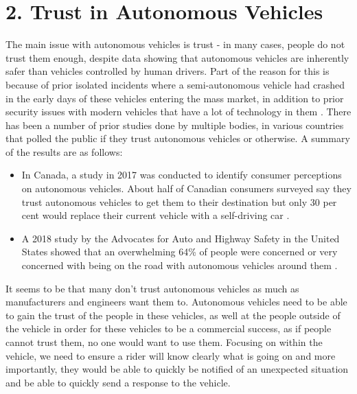 \documentclass{sigchi}
\begin{document}
\section{2. Trust in Autonomous Vehicles}

The main issue with autonomous vehicles is trust - in many cases, people do not trust them enough, despite data showing that autonomous vehicles are inherently safer than vehicles controlled by human drivers. Part of the reason for this is because of prior isolated incidents where a semi-autonomous vehicle had crashed in the early days of these vehicles entering the mass market, in addition to prior security issues with modern vehicles that have a lot of technology in them \cite{leggett_2018}. There has been a number of prior studies done by multiple bodies, in various countries that polled the public if they trust autonomous vehicles or otherwise. A summary of the results are as follows:
\begin{itemize}
\item In Canada, a study in 2017 was conducted to identify consumer perceptions on autonomous vehicles. About half of Canadian consumers surveyed say they trust autonomous vehicles to get them to their destination but only 30 per cent would replace their current vehicle with a self-driving car \cite{canpress_2017}.
\item A 2018 study by the Advocates for Auto and Highway Safety in the United States showed that an overwhelming 64\% of people were concerned or very concerned with being on the road with autonomous vehicles around them \cite{saferoads_2018} \cite{hawkins_2018}.
\end{itemize}

It seems to be that many don't trust autonomous vehicles as much as manufacturers and engineers want them to. Autonomous vehicles need to be able to gain the trust of the people in these vehicles, as well at the people outside of the vehicle in order for these vehicles to be a commercial success, as if people cannot trust them, no one would want to use them. Focusing on within the vehicle, we need to ensure a rider will know clearly what is going on and more importantly, they would be able to quickly be notified of an unexpected situation and be able to quickly send a response to the vehicle. 
\end{document}
